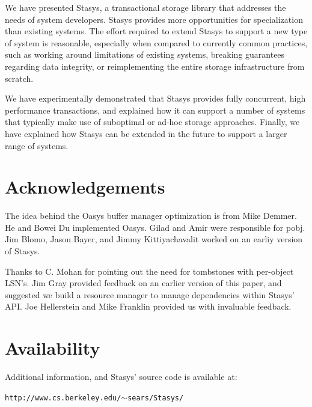 \documentclass[letterpaper,twocolumn,10pt]{article}
\newcommand{\yad}{Stasys\xspace}
\newcommand{\yads}{Stasys'\xspace}
\newcommand{\oasys}{Oasys\xspace}
\begin{document}
We have presented \yad, a transactional storage library that addresses
the needs of system developers.  \yad provides more opportunities for
specialization than existing systems.  The effort required to extend
\yad to support a new type of system is reasonable, especially when
compared to currently common practices, such as working around
limitations of existing systems, breaking guarantees regarding data
integrity, or reimplementing the entire storage infrastructure from
scratch.

We have experimentally demonstrated that \yad provides fully
concurrent, high performance transactions, and explained how it can
support a number of systems that typically make use of suboptimal or
ad-hoc storage approaches.  Finally, we have explained how \yad can be
extended in the future to support a larger range of systems.

\section{Acknowledgements}

The idea behind the \oasys buffer manager optimization is from Mike
Demmer.  He and Bowei Du implemented \oasys.  Gilad and Amir were
responsible for pobj.  Jim Blomo, Jason Bayer, and Jimmy
Kittiyachavalit worked on an earliy version of \yad.

Thanks to C. Mohan for pointing out the need for tombstones with
per-object LSN's.  Jim Gray provided feedback on an earlier version of
this paper, and suggested we build a resource manager to manage
dependencies within \yads API.  Joe Hellerstein and Mike Franklin
provided us with invaluable feedback.

\section{Availability}

Additional information, and \yads source code is available at:

\begin{center}
{\small{\tt http://www.cs.berkeley.edu/\ensuremath{\sim}sears/\yad/}}
\end{center}

{\footnotesize 
\nocite{*}
}

\theendnotes
\end{document}
